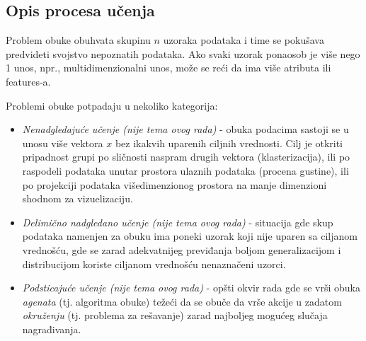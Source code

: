 \documentclass[fontsize=12bp, paper=a4]{scrarticle}
\begin{document}
\subsection{Opis procesa učenja}
Problem obuke obuhvata skupinu $n$ uzoraka podataka i time se pokušava predvideti svojstvo nepoznatih podataka. Ako svaki uzorak ponaosob je više nego 1 unos, npr., multidimenzionalni unos, može se reći da ima više atributa ili features-a.\cite{supervised}
\\
\justifying

Problemi obuke potpadaju u nekoliko kategorija:
\begin{itemize}
    \item \textit{Nenadgledajuće učenje (nije tema ovog rada)} - obuka podacima sastoji se u unosu više vektora $x$ bez ikakvih uparenih ciljnih vrednosti. Cilj je otkriti pripadnost grupi po sličnosti naspram drugih vektora (klasterizacija), ili po raspodeli podataka unutar prostora ulaznih podataka (procena gustine), ili po projekciji podataka višedimenzionog prostora na manje dimenzioni shodnom za vizuelizaciju.
    
    \item \textit{Delimično nadgledano učenje (nije tema ovog rada)\cite{semi}} - situacija gde skup podataka namenjen za obuku ima poneki uzorak koji nije uparen sa ciljanom vrednošću, gde se zarad adekvatnijeg previđanja boljom generalizacijom i distribucijom koriste ciljanom vrednošću nenaznačeni uzorci.
    
    \item \textit{Podsticajuće učenje (nije tema ovog rada)\cite{rl}} - opšti okvir rada gde se vrši obuka \textit{agenata} (tj. algoritma obuke) težeći da se obuče da vrše akcije u zadatom \textit{okruženju} (tj. problema za rešavanje) zarad najboljeg mogućeg slučaja nagrađivanja. 


\end{itemize}
\end{document}

